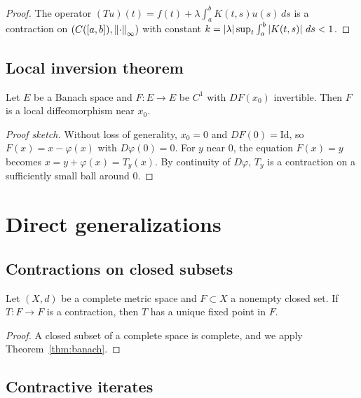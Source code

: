 \begin{proof}
The operator $(Tu)(t) = f(t) + \lambda \int_a^b K(t,s) u(s) \, ds$ is a
contraction on $(C([a,b]), \left\| \cdot \right\|_\infty)$ with constant
$k = \left| \lambda \right| \sup_t \int_a^b \left| K(t,s) \right| \, ds < 1$.
\end{proof}

\subsection{Local inversion theorem}

\begin{theorem}
Let $E$ be a Banach space and $F : E \to E$ be $C^1$ with $DF(x_0)$ invertible.
Then $F$ is a local diffeomorphism near $x_0$.
\end{theorem}

\begin{proof}[Proof sketch]
Without loss of generality, $x_0 = 0$ and $DF(0) = \mathrm{Id}$, so
$F(x) = x - \varphi(x)$ with $D\varphi(0) = 0$. For $y$ near $0$, the equation
$F(x) = y$ becomes $x = y + \varphi(x) = T_y(x)$. By continuity of $D\varphi$,
$T_y$ is a contraction on a sufficiently small ball around $0$.
\end{proof}

\section{Direct generalizations}

\subsection{Contractions on closed subsets}

\begin{proposition}
Let $(X, d)$ be a complete metric space and $F \subset X$ a nonempty closed set.
If $T : F \to F$ is a contraction, then $T$ has a unique fixed point in $F$.
\end{proposition}

\begin{proof}
A closed subset of a complete space is complete, and we apply
Theorem~\ref{thm:banach}.
\end{proof}

\subsection{Contractive iterates}

